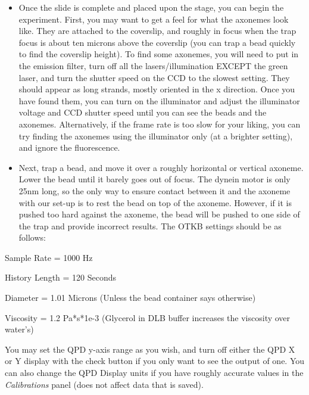\documentclass{../lab}
\begin{document}
\begin{itemize}
    \item Once the slide is complete and placed upon the stage, you can begin the experiment. First, you may want to get a feel for what the axonemes look like. They are attached to the coverslip, and roughly in focus when the trap focus is about ten microns above the coverslip (you can trap a bead quickly to find the coverslip height). To find some axonemes, you will need to put in the emission filter, turn off all the lasers/illumination EXCEPT the green laser, and turn the shutter speed on the CCD to the slowest setting. They should appear as long strands, mostly oriented in the x direction. Once you have found them, you can turn on the illuminator and adjust the illuminator voltage and CCD shutter speed until you can see the beads and the axonemes. Alternatively, if the frame rate is too slow for your liking, you can try finding the axonemes using the illuminator only (at a brighter setting), and ignore the fluorescence.

\end{itemize}

\begin{itemize}
    \item Next, trap a bead, and move it over a roughly horizontal or vertical axoneme. Lower the bead until it barely goes out of focus. The dynein motor is only 25nm long, so the only way to ensure contact between it and the axoneme with our set-up is to rest the bead on top of the axoneme. However, if it is pushed too hard against the axoneme, the bead will be pushed to one side of the trap and provide incorrect results. The OTKB settings should be as follows:

\end{itemize}

Sample Rate = 1000 Hz

History Length = 120 Seconds

Diameter = 1.01 Microns (Unless the bead container says otherwise)

Viscosity = 1.2 Pa*s*1e-3 (Glycerol in DLB buffer increases the viscosity over water's)

You may set the QPD y-axis range as you wish, and turn off either the QPD X or Y display with the check button if you only want to see the output of one. You can also change the QPD Display units if you have roughly accurate values in the \emph{Calibrations} panel (does not affect data that is saved).
\end{document}
